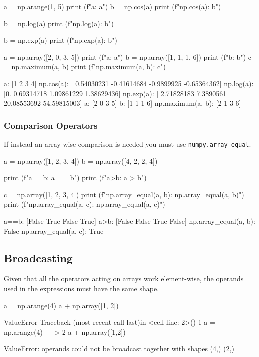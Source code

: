 \begin{ipythonnon}
a = np.arange(1, 5)
print (f"a: {a}")
b = np.cos(a)
print (f"np.cos(a): {b}")

b = np.log(a)
print (f"np.log(a): {b}")

b = np.exp(a)
print (f"np.exp(a): {b}")

a = np.array([2, 0, 3, 5])
print (f"a: {a}")
b = np.array([1, 1, 1, 6])
print (f"b: {b}")
c = np.maximum(a, b)
print (f"np.maximum(a, b): {c}")
\end{ipythonnon}
\begin{ioutput}
a: [1 2 3 4]
np.cos(a): [ 0.54030231 -0.41614684 -0.9899925  -0.65364362]
np.log(a): [0.         0.69314718 1.09861229 1.38629436]
np.exp(a): [ 2.71828183  7.3890561  20.08553692 54.59815003]
a: [2 0 3 5]
b: [1 1 1 6]
np.maximum(a, b): [2 1 3 6]
\end{ioutput}

\subsubsection{Comparison Operators}
If instead an array-wise comparison is needed you must use \texttt{numpy.array\_equal}.

\begin{ipythonnon}
a = np.array([1, 2, 3, 4])
b = np.array([4, 2, 2, 4])

print (f"a==b: {a == b}")
print (f"a>b: {a > b}")

c = np.array([1, 2, 3, 4])
print (f"np.array_equal(a, b): {np.array_equal(a, b)}")
print (f"np.array_equal(a, c): {np.array_equal(a, c)}")
\end{ipythonnon}
\begin{ioutput}
a==b: [False  True False  True]
a>b: [False False  True False]
np.array_equal(a, b): False
np.array_equal(a, c): True
\end{ioutput}

\subsection{Broadcasting}

Given that all the operators acting on arrays work element-wise, the operands used in the expressions must have the same shape.

\begin{ipythonnon}
a = np.arange(4)
a + np.array([1, 2])
\end{ipythonnon}
\begin{ioutput}
ValueError                                
Traceback (most recent call last)in <cell line: 2>()
      1 a = np.arange(4)
----> 2 a + np.array([1,2])

ValueError: operands could not be broadcast together with shapes (4,) (2,)
\end{ioutput}

